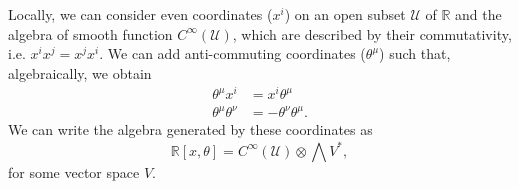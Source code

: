\begin{example}
\label{ex:comm_anticomm}
    Locally, we can consider even coordinates ($x^i$) on an open subset $\mathcal{U}$ of $\mathbb{R}$ and the algebra of smooth function $C^\infty (\mathcal{U})$, which are described by their commutativity, i.e. $x^i x^j = x^j x^i$.
    We can add anti-commuting coordinates ($\theta^\mu$) such that, algebraically, we obtain
    \begin{align*}
        \theta^\mu x^i &= x^i \theta^\mu \\
        \theta^\mu \theta^\nu &= -\theta^\nu \theta^\mu.
    \end{align*}
    We can write the algebra generated by these coordinates as
    \begin{equation*}
        \widehat{\mathbb{R}[x, \theta]} = C^\infty (\mathcal{U}) \otimes \bigwedge V^*,
    \end{equation*}
    for some vector space $V$.
\end{example}